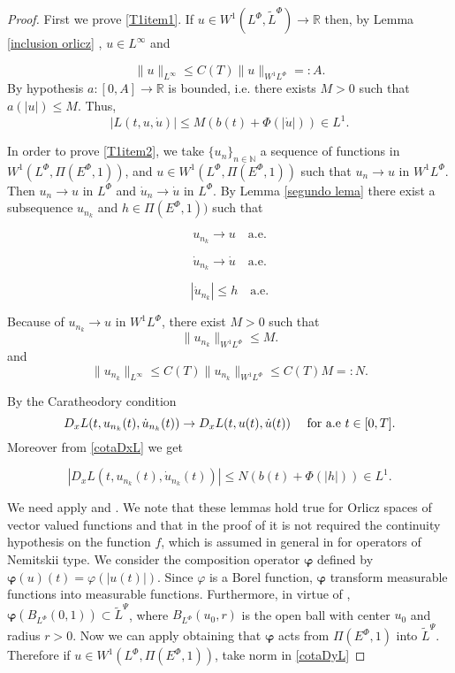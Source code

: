 \documentclass[twoside]{article}
\newcommand{\lphi}{L^{\Phi}}
\newcommand{\ephi}{E^{\Phi}}
\newcommand{\claseor}{\widetilde{L}^{\Phi}}
\newcommand{\wphi}{W^{1}\lphi}
\begin{document}
\begin{proof}

First we prove \ref{T1item1}. If $u\in W^{1}(\lphi,\claseor) \rightarrow \mathbb{R}$ then, by Lemma \ref{inclusion orlicz} ,
 $u\in L^{\infty}$ and

 \[\|u\|_{L^{\infty}}\leq C(T)\|u\|_{\wphi}=:A.\]
  By hypothesis
 $a:[0,A]\rightarrow\mathbb{R}$ is bounded, i.e. there exists
 $M>0$ such that $a(|u|)\leq M$.
 Thus,
 \[|L(t,u,\dot{u})| \leq M\left(b(t)+ \Phi(|\dot{u}|)  \right)\in
 L^1.\]

 In order to prove \ref{T1item2}, we take   $\{u_n\}_{n\in \mathbb{N}}$ a sequence of  functions in $W^{1}(\lphi,\Pi(\ephi,1))$, and $u\in W^{1}(\lphi,\Pi(\ephi,1))$ such that $u_n\rightarrow u$ in $\wphi$.
Then $u_n\rightarrow u$ in $\lphi$ and $\dot{u}_n\rightarrow \dot{u}$ in $\lphi$. By Lemma \ref{segundo lema} there exist a subsequence $u_{n_k}$ and $h\in \Pi(\ephi,1))$
such that

\[u_{n_k}\rightarrow u \quad\text{a.e.}\]

\[\dot{u}_{n_k}\rightarrow \dot{u} \quad\text{a.e.}\]

\[|\dot{u}_{n_k}|\leq h\quad\text{a.e.}\]

Because of $u_{n_k}\rightarrow u$ in $\wphi$, there exist $M>0$ such that \[\|u_{n_k}\|_{\wphi}\leq M.\]
and
\[\|u_{n_k}\|_{L^{\infty}} \leq  C(T)\|u_{n_k}\|_{\wphi}\leq C(T)M=:N.\]

By the Caratheodory condition
\[D_xL(t,u_{n_k}(t),\dot{u}_{n_k}(t))\to D_xL(t,u(t),\dot{u}(t))\quad\hbox{ for a.e }t\in[0,T].\]
Moreover from \eqref{cotaDxL} we get

\begin{equation}\label{DxL1}
|D_xL(t,u_{n_k}(t),\dot{u}_{n_k}(t))|\leq N\left(b(t)+\Phi(|h|)\right) \in L^1.
\end{equation}

  We need apply \cite[Lemma 9.1]{KR} and \cite[Lemma 17.1]{KR}. We note that these lemmas hold true for
Orlicz spaces of vector valued functions and that in the proof of
\cite[Lemma 17.1]{KR}   it is not required the continuity
hypothesis  on the function  $f$, which is assumed
 in general in \cite{KR} for operators of Nemitskii type.  We consider the composition operator
$\boldsymbol{\varphi}$ defined by $\boldsymbol{\varphi}(u)(t)= \varphi(|u(t)|)$. Since $\varphi$ is a Borel function, $\boldsymbol{\varphi}$ transform measurable
functions into measurable functions. Furthermore, in virtue of \cite[Lemma 9.1]{KR}, $\boldsymbol{\varphi}\left(B_{\lphi}(0,1)\right)\subset \tilde{L}^{\Psi}$, where
$B_{\lphi}(u_0,r)$ is the open ball with center $u_0$ and radius $r>0$.  Now we can apply \cite[Lemma 17.1]{KR} obtaining that $\boldsymbol{\varphi}$ acts from
$\Pi(\ephi,1)$ into {\color{red}$\tilde{L}^{\Psi}$}. Therefore if $u\in W^{1}(\lphi,\Pi(\ephi,1))$, take norm in \eqref{cotaDyL}


\end{proof}
\end{document}
